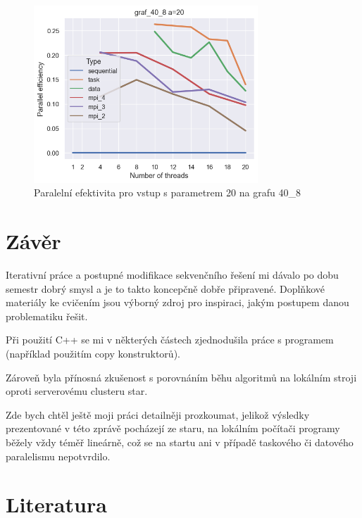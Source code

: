 \documentclass[epsf,epic,eepic,eepicemu]{article}\oddsidemargin=-5mm
\begin{document}
\begin{figure}
\centering
\includegraphics[width=0.75\textwidth]{images/efficency_20__40_8}
\caption{Paralelní efektivita pro vstup s parametrem 20 na grafu 40\_8}
\label{fig:efficency_20__40_8}
\end{figure}

\section{Závěr}

Iterativní práce a postupné modifikace sekvenčního řešení mi dávalo po dobu semestr dobrý smysl a je to takto koncepčně dobře připravené. Doplňkové materiály ke cvičením jsou výborný zdroj pro inspiraci, jakým postupem danou problematiku řešit.

Při použití C++ se mi v některých částech zjednodušila práce s programem (například použitím copy konstruktorů).

Zároveň byla přínosná zkušenost s porovnáním běhu algoritmů na lokálním stroji oproti serverovému clusteru star.

Zde bych chtěl ještě moji práci detailněji prozkoumat, jelikož výsledky prezentované v této zprávě pocházejí ze staru, na lokálním počítači programy běžely vždy téměř lineárně, což se na startu ani v případě taskového či datového paralelismu nepotvrdilo.

\section{Literatura}



\end{document}
